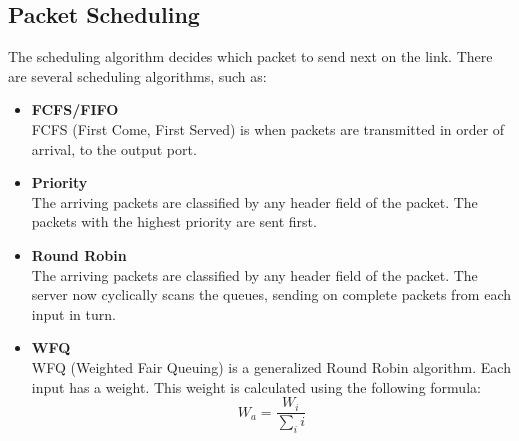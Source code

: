 \documentclass{article}
\begin{document}
\subsection{Packet Scheduling}
The scheduling algorithm decides which packet to send next on the link. There are several scheduling algorithms, such as:

\begin{itemize}
	\item \textbf{FCFS/FIFO}
	\vspace{.2cm} \\
	FCFS (First Come, First Served) is when packets are transmitted in order of arrival, to the output port.
	
	\item \textbf{Priority}
	\vspace{.2cm	} \\
	The arriving packets are classified by any header field of the packet. The packets with the highest priority are sent first.
	
	\item \textbf{Round Robin}
	\vspace{.2cm} \\
	The arriving packets are classified by any header field of the packet. The server now cyclically scans the queues, sending on complete packets from each input in turn.
	
	\item \textbf{WFQ}
	\vspace{.2cm} \\
	WFQ (Weighted Fair Queuing) is a generalized Round Robin algorithm. Each input has a weight. This weight is calculated using the following formula: \\
	\[ W_a = \frac{W_i}{\sum_i i} \]
\end{itemize}
\end{document}
